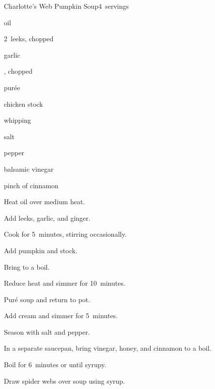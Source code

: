 \begin{recipe}{Charlotte's Web Pumpkin Soup}{}{4~servings}

\begin{ingredients}
\item {} oil
\item 2~leeks, chopped
\item {} garlic
\item {} , chopped
\item {}  purée
\item {} chicken stock
\item \C{\quarter} whipping 
\item salt
\item pepper
\item \C{\half} balsamic vinegar
\item {} 
\item pinch of cinnamon
\end{ingredients}

\begin{directions}
\item Heat oil over medium heat.
\item Add leeks, garlic, and ginger.
\item Cook for 5~minutes, stirring occasionally.
\item Add pumpkin and stock.
\item Bring to a boil.
\item Reduce heat and simmer for 10~minutes.
\item Puré soup and return to pot.
\item Add cream and simmer for 5~minutes.
\item Season with salt and pepper.
\item In a separate saucepan, bring vinegar, honey, and cinnamon to a boil.
\item Boil for 6~minutes or until syrupy.
\item Draw spider webs over soup using syrup.
\end{directions}

\end{recipe}
